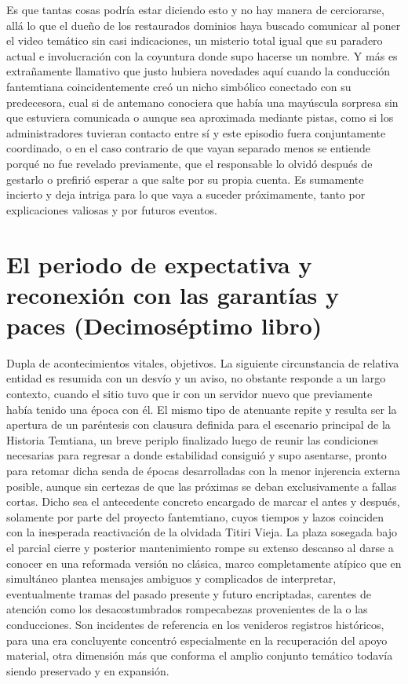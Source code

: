 \documentclass[
]{book}
\begin{document}
Es que tantas cosas podría estar diciendo esto y no hay manera de cerciorarse, allá lo que el dueño de los restaurados dominios haya buscado comunicar al poner el video temático sin casi indicaciones, un misterio total igual que su paradero actual e involucración con la coyuntura donde supo hacerse un nombre. Y más es extrañamente llamativo que justo hubiera novedades aquí cuando la conducción fantemtiana coincidentemente creó un nicho simbólico conectado con su predecesora, cual si de antemano conociera que había una mayúscula sorpresa sin que estuviera comunicada o aunque sea aproximada mediante pistas, como si los administradores tuvieran contacto entre sí y este episodio fuera conjuntamente coordinado, o en el caso contrario de que vayan separado menos se entiende porqué no fue revelado previamente, que el responsable lo olvidó después de gestarlo o prefirió esperar a que salte por su propia cuenta. Es sumamente incierto y deja intriga para lo que vaya a suceder próximamente, tanto por explicaciones valiosas y por futuros eventos.

\hypertarget{el-periodo-de-expectativa-y-reconexiuxf3n-con-las-garantuxedas-y-paces-decimosuxe9ptimo-libro}{%
\chapter{El periodo de expectativa y reconexión con las garantías y paces (Decimoséptimo libro)}\label{el-periodo-de-expectativa-y-reconexiuxf3n-con-las-garantuxedas-y-paces-decimosuxe9ptimo-libro}}

Dupla de acontecimientos vitales, objetivos. La siguiente circunstancia de relativa entidad es resumida con un desvío y un aviso, no obstante responde a un largo contexto, cuando el sitio tuvo que ir con un servidor nuevo que previamente había tenido una época con él. El mismo tipo de atenuante repite y resulta ser la apertura de un paréntesis con clausura definida para el escenario principal de la Historia Temtiana, un breve periplo finalizado luego de reunir las condiciones necesarias para regresar a donde estabilidad consiguió y supo asentarse, pronto para retomar dicha senda de épocas desarrolladas con la menor injerencia externa posible, aunque sin certezas de que las próximas se deban exclusivamente a fallas cortas. Dicho sea el antecedente concreto encargado de marcar el antes y después, solamente por parte del proyecto fantemtiano, cuyos tiempos y lazos coinciden con la inesperada reactivación de la olvidada Titiri Vieja. La plaza sosegada bajo el parcial cierre y posterior mantenimiento rompe su extenso descanso al darse a conocer en una reformada versión no clásica, marco completamente atípico que en simultáneo plantea mensajes ambiguos y complicados de interpretar, eventualmente tramas del pasado presente y futuro encriptadas, carentes de atención como los desacostumbrados rompecabezas provenientes de la o las conducciones. Son incidentes de referencia en los venideros registros históricos, para una era concluyente concentró especialmente en la recuperación del apoyo material, otra dimensión más que conforma el amplio conjunto temático todavía siendo preservado y en expansión.
\end{document}
